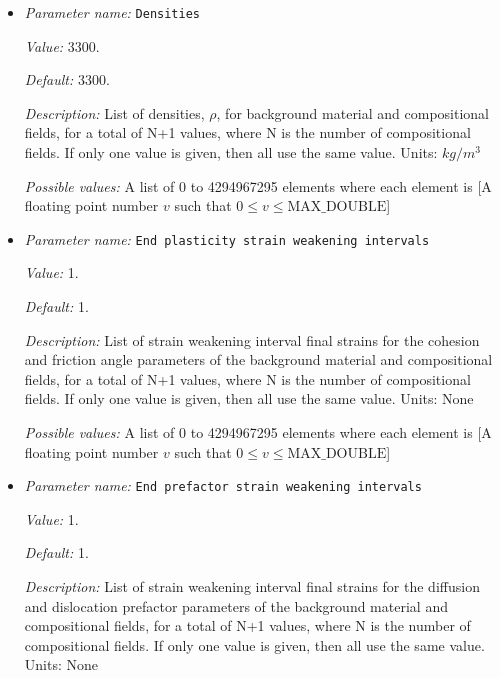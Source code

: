 \begin{itemize}
{\it Possible values:} A list of 0 to 4294967295 elements where each element is [A floating point number $v$ such that $0 \leq v \leq \text{MAX\_DOUBLE}$]
\item {\it Parameter name:} {\tt Densities}
\label{parameters:Material model/Visco Plastic/Densities}


{\it Value:} 3300.


{\it Default:} 3300.


{\it Description:} List of densities, $\rho$, for background material and compositional fields, for a total of N+1 values, where N is the number of compositional fields. If only one value is given, then all use the same value.  Units: $kg / m^3$


{\it Possible values:} A list of 0 to 4294967295 elements where each element is [A floating point number $v$ such that $0 \leq v \leq \text{MAX\_DOUBLE}$]
\item {\it Parameter name:} {\tt End plasticity strain weakening intervals}
\label{parameters:Material model/Visco Plastic/End plasticity strain weakening intervals}


{\it Value:} 1.


{\it Default:} 1.


{\it Description:} List of strain weakening interval final strains for the cohesion and friction angle parameters of the background material and compositional fields, for a total of N+1 values, where N is the number of compositional fields. If only one value is given, then all use the same value.  Units: None


{\it Possible values:} A list of 0 to 4294967295 elements where each element is [A floating point number $v$ such that $0 \leq v \leq \text{MAX\_DOUBLE}$]
\item {\it Parameter name:} {\tt End prefactor strain weakening intervals}
\label{parameters:Material model/Visco Plastic/End prefactor strain weakening intervals}


{\it Value:} 1.


{\it Default:} 1.


{\it Description:} List of strain weakening interval final strains for the diffusion and dislocation prefactor parameters of the background material and compositional fields, for a total of N+1 values, where N is the number of compositional fields. If only one value is given, then all use the same value.  Units: None



\end{itemize}
